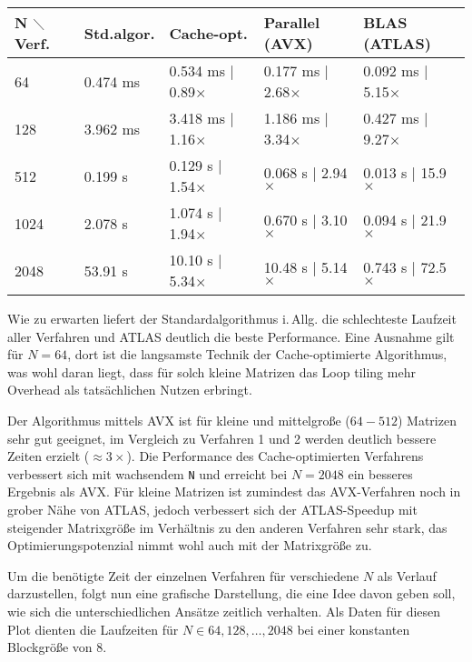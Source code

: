 \documentclass[a4paper,11pt]{scrartcl}
\newcommand{\iAllg}{\mbox{i.\,Allg.}\xspace}
\begin{document}
\begin{center}
\begin{tabular}{| l | l || l || l || l |}
\hline
N $\diagdown$ Verf. & Std.algor. & Cache-opt. & Parallel (AVX) & BLAS (ATLAS)  \\ \hline

64 & 0.474 ms & 0.534 ms | 0.89$\times$ & 0.177 ms | 2.68$\times$ & 0.092 ms | 5.15$\times$  \\ \hline
128 & 3.962 ms & 3.418 ms | 1.16$\times$ & 1.186 ms | 3.34$\times$ & 0.427 ms | 9.27$\times$  \\ \hline 
\hline
512 & 0.199 s & 0.129 s | 1.54$\times$ & 0.068 s | 2.94$\times$ & 0.013 s | 15.9$\times$  \\ \hline
1024 & 2.078 s &  1.074 s | 1.94$\times$ & 0.670 s | 3.10$\times$ & 0.094 s | 21.9$\times$ \\ \hline
2048 & 53.91 s & 10.10 s | 5.34$\times$ & 10.48 s | 5.14$\times$ & 0.743 s | 72.5$\times$ \\ \hline
\end{tabular}
\end{center}

Wie zu erwarten liefert der Standardalgorithmus \iAllg die schlechteste Laufzeit aller 
Verfahren und ATLAS deutlich die beste Performance.
Eine Ausnahme gilt für $N=64$, dort ist die langsamste Technik der Cache-optimierte
Algorithmus, was wohl daran liegt, dass für solch kleine Matrizen das Loop tiling mehr
Overhead als tatsächlichen Nutzen erbringt.\newline

Der Algorithmus mittels AVX ist für kleine und mittelgroße ($64-512$) Matrizen sehr gut
geeignet, im Vergleich zu Verfahren 1 und 2 werden deutlich bessere Zeiten erzielt
($\approx 3\times$).
Die Performance des Cache-optimierten Verfahrens verbessert sich mit wachsendem \texttt{N}
und erreicht bei $N=2048$ ein besseres Ergebnis als AVX. Für kleine Matrizen ist zumindest das AVX-Verfahren noch in grober Nähe von ATLAS,
jedoch verbessert sich der ATLAS-Speedup mit steigender Matrixgröße im Verhältnis
zu den anderen Verfahren sehr stark, das Optimierungspotenzial nimmt wohl auch mit der Matrixgröße zu.
\newline

Um die benötigte Zeit der einzelnen Verfahren für verschiedene $N$ als Verlauf darzustellen,
folgt nun eine grafische Darstellung, die eine Idee davon geben soll, wie sich die unterschiedlichen
Ansätze zeitlich verhalten. Als Daten für diesen Plot dienten die Laufzeiten für $N \in 64, 128, \ldots ,
2048$ bei einer konstanten Blockgröße von $8$.
\end{document}
